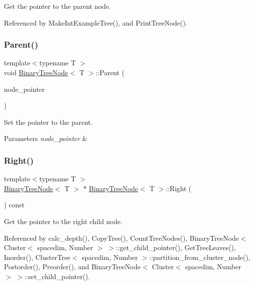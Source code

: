 Get the pointer to the parent node. 

Referenced by Make\+Int\+Example\+Tree(), and Print\+Tree\+Node().

\mbox{\label{classBinaryTreeNode_abd72fc34f46fb41abdf9a692b4db0cdd}} 
\subsubsection{\texorpdfstring{Parent()}{Parent()}\hspace{0.1cm}{\footnotesize\ttfamily [2/2]}}
{\footnotesize\ttfamily template$<$typename T $>$ \\
void \hyperlink{classBinaryTreeNode}{Binary\+Tree\+Node}$<$ T $>$\+::Parent (\begin{DoxyParamCaption}\item[{const \hyperlink{classBinaryTreeNode}{Binary\+Tree\+Node}$<$ T $>$ $\ast$}]{node\+\_\+pointer }\end{DoxyParamCaption})}

Set the pointer to the parent. 
\begin{DoxyParams}{Parameters}
{\em node\+\_\+pointer} & \\
\hline
\end{DoxyParams}
\mbox{\label{classBinaryTreeNode_ade872fc08f12c154c28c934a3991ae08}} 
\subsubsection{\texorpdfstring{Right()}{Right()}\hspace{0.1cm}{\footnotesize\ttfamily [1/2]}}
{\footnotesize\ttfamily template$<$typename T $>$ \\
\hyperlink{classBinaryTreeNode}{Binary\+Tree\+Node}$<$ T $>$ $\ast$ \hyperlink{classBinaryTreeNode}{Binary\+Tree\+Node}$<$ T $>$\+::Right (\begin{DoxyParamCaption}\item[{void}]{ }\end{DoxyParamCaption}) const}

Get the pointer to the right child node. 

Referenced by calc\+\_\+depth(), Copy\+Tree(), Count\+Tree\+Nodes(), Binary\+Tree\+Node$<$ Cluster$<$ spacedim, Number $>$ $>$\+::get\+\_\+child\+\_\+pointer(), Get\+Tree\+Leaves(), Inorder(), Cluster\+Tree$<$ spacedim, Number $>$\+::partition\+\_\+from\+\_\+cluster\+\_\+node(), Postorder(), Preorder(), and Binary\+Tree\+Node$<$ Cluster$<$ spacedim, Number $>$ $>$\+::set\+\_\+child\+\_\+pointer().

